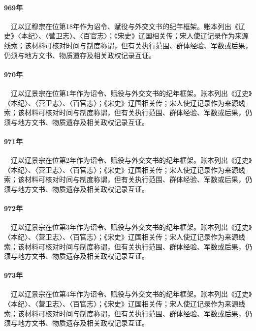 \paragraph{969年}　辽以辽穆宗在位第18年作为诏令、赋役与外交文书的纪年框架。账本列出《辽史》〈本纪〉、〈营卫志〉、〈百官志〉；《宋史》辽国相关传；宋人使辽记录作为来源线索；该材料可核对时间与制度称谓，但有关执行范围、群体经验、军数或后果，仍须与地方文书、物质遗存及相关政权记录互证。

\paragraph{970年}　辽以辽景宗在位第1年作为诏令、赋役与外交文书的纪年框架。账本列出《辽史》〈本纪〉、〈营卫志〉、〈百官志〉；《宋史》辽国相关传；宋人使辽记录作为来源线索；该材料可核对时间与制度称谓，但有关执行范围、群体经验、军数或后果，仍须与地方文书、物质遗存及相关政权记录互证。

\paragraph{971年}　辽以辽景宗在位第2年作为诏令、赋役与外交文书的纪年框架。账本列出《辽史》〈本纪〉、〈营卫志〉、〈百官志〉；《宋史》辽国相关传；宋人使辽记录作为来源线索；该材料可核对时间与制度称谓，但有关执行范围、群体经验、军数或后果，仍须与地方文书、物质遗存及相关政权记录互证。

\paragraph{972年}　辽以辽景宗在位第3年作为诏令、赋役与外交文书的纪年框架。账本列出《辽史》〈本纪〉、〈营卫志〉、〈百官志〉；《宋史》辽国相关传；宋人使辽记录作为来源线索；该材料可核对时间与制度称谓，但有关执行范围、群体经验、军数或后果，仍须与地方文书、物质遗存及相关政权记录互证。

\paragraph{973年}　辽以辽景宗在位第4年作为诏令、赋役与外交文书的纪年框架。账本列出《辽史》〈本纪〉、〈营卫志〉、〈百官志〉；《宋史》辽国相关传；宋人使辽记录作为来源线索；该材料可核对时间与制度称谓，但有关执行范围、群体经验、军数或后果，仍须与地方文书、物质遗存及相关政权记录互证。

